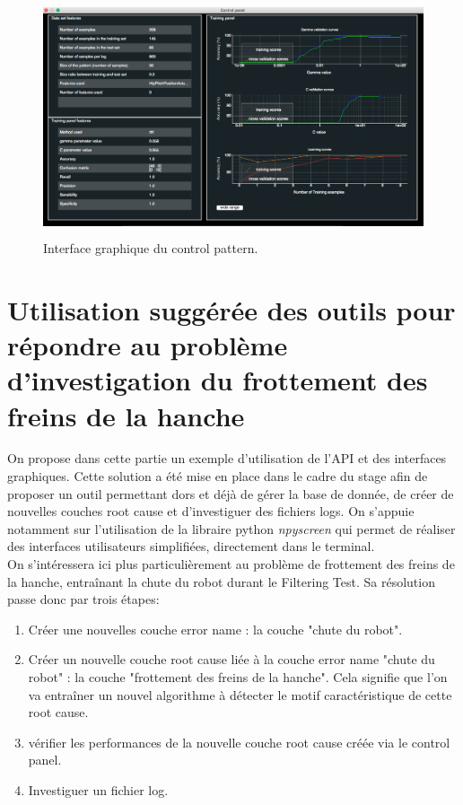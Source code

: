 \begin{figure}[h]
	\centering\includegraphics[height=7cm]{images/control_panel.png}
	\caption[Interface graphique du control pattern]{Interface graphique du control pattern.}
	\label{fig:Interface graphique du control pattern}
\end{figure}

\section{Utilisation suggérée des outils pour répondre au problème d'investigation du frottement des freins de la hanche}
\label{Industrialisation du produit: Utilisation suggérée des outils}
On propose dans cette partie un exemple d'utilisation de l'API et des interfaces graphiques. Cette solution a été mise en place dans le cadre du stage afin de proposer un outil permettant dors et déjà de gérer la base de donnée, de créer de nouvelles couches root cause et d'investiguer des fichiers logs. On s'appuie notamment sur l'utilisation de la libraire python \emph{npyscreen} \cite{Npyscreen} qui permet de réaliser des interfaces utilisateurs simplifiées, directement dans le terminal. \\
On s'intéressera ici plus particulièrement au problème de frottement des freins de la hanche, entraînant la chute du robot durant le Filtering Test. Sa résolution passe donc par trois étapes: 
\begin{enumerate}
	\item Créer une nouvelles couche error name : la couche "chute du robot". 
	\item Créer un nouvelle couche root cause liée à la couche error name "chute du robot" : la couche "frottement des freins de la hanche". Cela signifie que l'on va entraîner un nouvel algorithme à détecter le motif caractéristique de cette root cause. 
	\item vérifier les performances de la nouvelle couche root cause créée via le control panel.
	\item Investiguer un fichier log. 
\end{enumerate}

